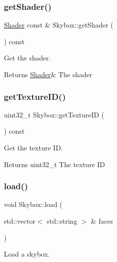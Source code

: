 \subsubsection{\texorpdfstring{get\+Shader()}{getShader()}\hspace{0.1cm}{\footnotesize\ttfamily [2/2]}}
{\footnotesize\ttfamily \hyperlink{class_shader}{Shader} const  \& Skybox\+::get\+Shader (\begin{DoxyParamCaption}{ }\end{DoxyParamCaption}) const}



Get the shader. 

\begin{DoxyReturn}{Returns}
\hyperlink{class_shader}{Shader}\& The shader 
\end{DoxyReturn}
\mbox{\label{class_skybox_a4325d2aaa63fafa4b164fd207b185b12}} 
\subsubsection{\texorpdfstring{get\+Texture\+I\+D()}{getTextureID()}}
{\footnotesize\ttfamily uint32\+\_\+t Skybox\+::get\+Texture\+ID (\begin{DoxyParamCaption}{ }\end{DoxyParamCaption}) const}



Get the texture ID. 

\begin{DoxyReturn}{Returns}
uint32\+\_\+t The texture ID 
\end{DoxyReturn}
\mbox{\label{class_skybox_a5ee5403ca72532870de608185481c3ba}} 
\subsubsection{\texorpdfstring{load()}{load()}}
{\footnotesize\ttfamily void Skybox\+::load (\begin{DoxyParamCaption}\item[{std\+::vector$<$ std\+::string $>$ \&}]{faces }\end{DoxyParamCaption})}



Load a skybox. 


